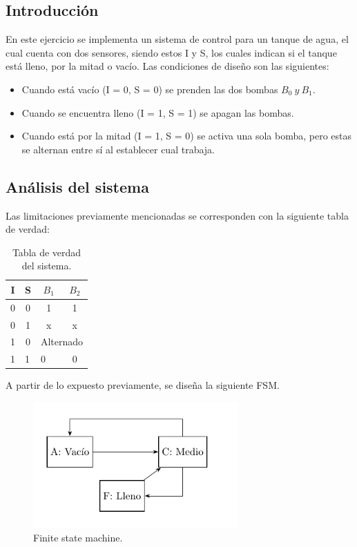 \subsection{Introducción}

En este ejercicio se implementa un sistema de control para un tanque de agua, el cual cuenta con dos sensores, siendo estos I y S, los cuales indican si el tanque está lleno, por la mitad o vacío. Las condiciones de diseño son las siguientes:
\begin{itemize}
\item Cuando está vacío (I = 0, S = 0) se prenden las dos bombas $B_0 \ y \ B_1$.
\item Cuando se encuentra lleno (I = 1, S = 1) se apagan las bombas.
\item Cuando está por la mitad (I = 1, S = 0) se activa una sola bomba, pero estas se alternan entre sí al establecer cual trabaja.
\end{itemize}

\subsection{Análisis del sistema}
Las limitaciones previamente mencionadas se corresponden con la siguiente tabla de verdad:
\begin{table}[H]
\centering
\begin{tabular}{cccc}
\hline
\textbf{I}              & \textbf{S}             & \textbf{$B_1$}         & \textbf{$B_2$} \\ \hline
0                       & 0                      & 1                      & 1              \\ 
0                       & 1                      & x                      & x              \\ 
1                       & 0                      & \multicolumn{2}{c}{Alternado}          \\ 
\multicolumn{1}{l}{1} & \multicolumn{1}{l}{1} & \multicolumn{1}{l}{0} & 0              \\ \hline
\end{tabular}
\caption{Tabla de verdad del sistema.}
\end{table}

A partir de lo expuesto previamente, se diseña la siguiente FSM.
\begin{figure}[H]
	\centering
	\includegraphics[width=0.7\textwidth]{ImagenesEjercicio1/Bloques-TT.pdf}
	\caption{Finite state machine.}
	\label{fig:fsm}
\end{figure}

